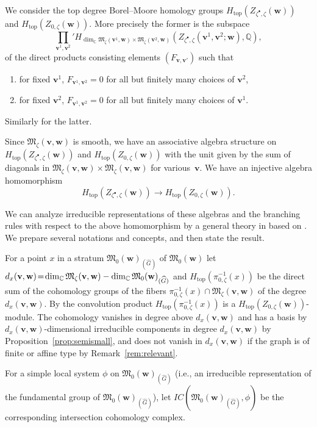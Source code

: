 \documentclass[11pt]{article}
\theoremstyle{definition}
\numberwithin{equation}{section}
\newcommand{\propref}[1]{Proposition~\ref{#1}}
\newcommand{\remref}[1]{Remark~\ref{#1}}
\newcommand{\C}{{\mathbb C}}
\newcommand{\Q}{{\mathbb Q}}
\newcommand{\M}{{\mathfrak M}} %
\newcommand{\bv}{{\mathbf v}} %
\newcommand{\bw}{{\mathbf w}} %
\newcommand{\topdeg}{{\operatorname{top}}} %
\begin{document}
We consider the top degree Borel--Moore homology groups
$H_\topdeg(Z_{\zeta^\bullet,\zeta}(\bw))$ and
$H_\topdeg(Z_{0,\zeta}(\bw))$. More precisely the former is the subspace
\[
\prod_{\bv^1,\bv^2}' H_{\dim_\C \M_\zeta(\bv^1,\bw)\times\M_\zeta(\bv^2,\bw)}
(Z_{\zeta^\bullet,\zeta}(\bv^1,\bv^2;\bw),\Q),
\]
of the direct products consisting elements $(F_{\bv,\bv'})$ such
that{\samepage
\begin{enumerate}\itemsep=0pt
\item[1)] for f\/ixed $\bv^1$, $F_{\bv^1,\bv^2} = 0$ for all but f\/initely
many choices of $\bv^2$,
\item[2)] for f\/ixed $\bv^2$, $F_{\bv^1,\bv^2} = 0$  for all but f\/initely
many choices of $\bv^1$.
\end{enumerate}
Similarly for the latter.}

Since $\M_\zeta(\bv,\bw)$ is smooth, we have an associative algebra
structure on $H_\topdeg(Z_{\zeta^\bullet,\zeta}(\bw))$ and
$H_\topdeg(Z_{0,\zeta}(\bw))$ with the unit given by the sum of
diagonals in $\M_\zeta(\bv,\bw)\times\M_\zeta(\bv,\bw)$ for va\-rious~$\bv$.
%
We have an injective algebra homomorphism
\begin{equation}\label{eq:subalg}
    H_\topdeg(Z_{\zeta^\bullet,\zeta}(\bw)) \to
    H_\topdeg(Z_{0,\zeta}(\bw)).
\end{equation}

We can analyze irreducible representations of these algebras and the
branching rules with respect to the above homomorphism by a general
theory in \cite{CG} based on \cite{BM}. We prepare several notations
and concepts, and then state the result.

For a point $x$ in a stratum $\M_0(\bw)_{(\widehat G)}$ of
$\M_0(\bw)$ let $d_x(\bv,\bw)\! =\! \dim_\C \M_\zeta(\bv,\bw)
-\linebreak[2] \dim_\C \M_0(\bw)_{(\widehat G)}$ and
$H_\topdeg(\pi_{0,\zeta}^{-1}(x))$ be the direct sum of the cohomology
groups of the f\/ibers $\pi_{0,\zeta}^{-1}(x)\cap\M_\zeta(\bv,\bw)$ of
the degree $d_x(\bv,\bw)$.  By the convolution product
$H_\topdeg(\pi_{0,\zeta}^{-1}(x))$ is a
$H_\topdeg(Z_{0,\zeta}(\bw))$-module. The cohomology vanishes in
degree above $d_x(\bv,\bw)$ and has a basis by
$d_x(\bv,\bw)$-dimensional irreducible components in degree
$d_x(\bv,\bw)$ by \propref{prop:semismall}, and does not vanish in
$d_x(\bv,\bw)$ if the graph is of f\/inite or af\/f\/ine type by
\remref{rem:relevant}.

For a simple local system $\phi$ on $\M_0(\bw)_{(\widehat G)}$ (i.e.,
an irreducible representation of the fundamental group of
$\M_0(\bw)_{(\widehat G)}$), let $IC(\M_0(\bw)_{(\widehat G)}, \phi)$
be the corresponding intersection cohomology complex.
\end{document}
